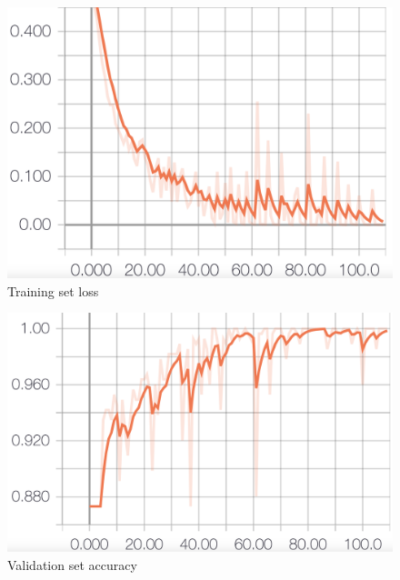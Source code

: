\documentclass[8pt,notitlepage]{report}
\begin{document}
			\begin{figure}[H]
				\begin{center}
					\includegraphics[scale=.1865]{loss_Antonio}
					\caption{Training set loss}
				\end{center}
			\end{figure}
			
			\begin{figure}[H]
				\begin{center}
					\includegraphics[scale=.1865]{val_acc_Antonio}
					\caption{Validation set accuracy}
					\label{fig:acc_val_Antonio}
				\end{center}
			\end{figure}
			
\end{document}

